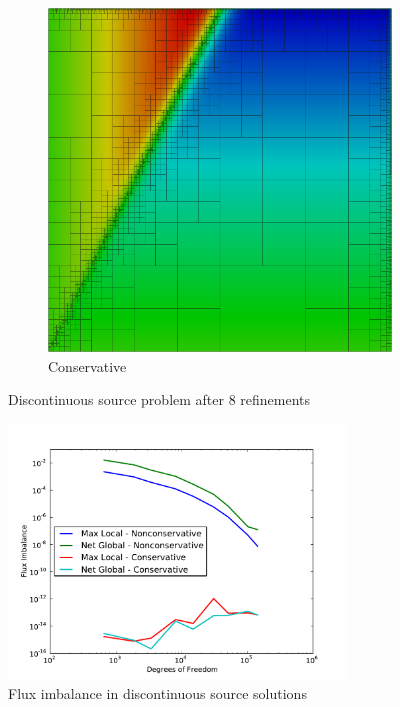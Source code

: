 \documentclass[letterpaper]{article}
\begin{document}
\begin{figure}[p]
\begin{subfigure}[t]{0.45\textwidth}
\includegraphics[width=\textwidth]{figs/Discontinuous/robust8nc.png}
\caption{Conservative}
\label{fig:discontinuousModified8c}
\end{subfigure}
\caption{Discontinuous source problem after 8 refinements}
\label{fig:discontinuous}
\end{figure}

\begin{figure}[p]
\centering
\includegraphics[width=0.8\textwidth]{figs/Discontinuous/modifiedFlux.pdf}
\caption{Flux imbalance in discontinuous source solutions}
\label{fig:discontinuous_flux}
\end{figure}
\end{document}
